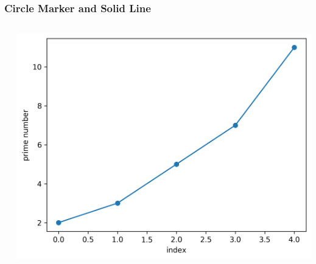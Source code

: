 \documentclass[xcolor={svgnames}]{beamer}
\newcommand{\pyfile}[2][]{}
\begin{document}
\begin{frame}[t,fragile]
    \frametitle{Circle Marker and Solid Line}
    \vspace{5mm}
    \begin{columns}[T]
        \begin{column}{0.52\textwidth}
            \pyfile{examples/05-circle-marker-solid.py}
        \end{column}
        \begin{column}{0.48\textwidth}
            \includegraphics[width=\textwidth]{img/05-circle-marker-solid.png}
        \end{column}
    \end{columns}
\end{frame}
\end{document}
